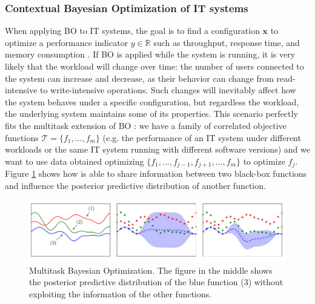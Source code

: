 \documentclass[a4paper, 12pt]{article} %
\begin{document}
	\subsubsection{Contextual Bayesian Optimization of IT systems} \label{ssec:contextual_bayesian_optimization}
	
	When applying BO to IT systems, the goal is to find a configuration $\pmb{x}$ to optimize a performance indicator $y \in \mathbb{R}$ such as throughput, response time, and memory consumption \cite{AkamasCGP}. If BO is applied while the system is running, it is very likely that the workload will change over time: the number of users connected to the system can increase and decrease, as their behavior can change from read-intensive to write-intensive operations. Such changes will inevitably affect how the system behaves under a specific configuration, but regardless the workload, the underlying system maintains some of its properties. 
	This scenario perfectly fits the multitask extension of BO \cite{CGPBanditOptimization}: we have a family of correlated objective functions $\mathcal{T}=\{f_1, ..., f_m\}$ (e.g. the performance of an IT system under different workloads or the same IT system running with different software versions) and we want to use data obtained optimizing $\{f_1, ..., f_{j-1}, f_{j+1}, ..., f_m\}$ to optimize $f_j$. Figure \ref{fig:multitask_bo} shows how \cite{CGPBanditOptimization} is able to share information between two black-box functions and influence the posterior predictive distribution of another function.
	
	\begin{figure} 
		\includegraphics[width=\linewidth]{img/multitask_bo.png}
		\caption{Multitask Bayesian Optimization. The figure in the middle shows the posterior predictive distribution of the blue function (3) without exploiting the information of the other functions.} \label{fig:multitask_bo}
	\end{figure}
	
\end{document}
